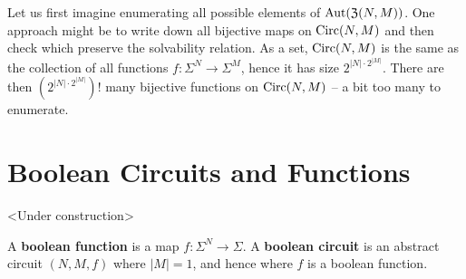 \documentclass{article}
\begin{document}
Let us first imagine enumerating all possible elements of $\operatorname{Aut}(\operatorname{\mathfrak{Z}}(N,M))$. One approach might be to write down all bijective maps on $\operatorname{Circ}(N,M)$ and then check which preserve the solvability relation. As a set, $\operatorname{Circ}(N,M)$ is the same as the collection of all functions $f:\Sigma^N \to \Sigma^M$, hence it has size $2^{|N|\cdot 2^{|M|}}$. There are then $\left(2^{|N|\cdot 2^{|M|}}\right)!$ many bijective functions on $\operatorname{Circ}(N,M)$ -- a bit too many to enumerate.

\section{Boolean Circuits and Functions}\label{sec:bool-circuits}
\begin{center}
  <Under construction>
\end{center}

A \textbf{boolean function} is a map $f:\Sigma^N \to \Sigma$. A \textbf{boolean circuit} is an abstract circuit $(N, M, f)$ where $|M| = 1$, and hence where $f$ is a boolean function.
\end{document}
